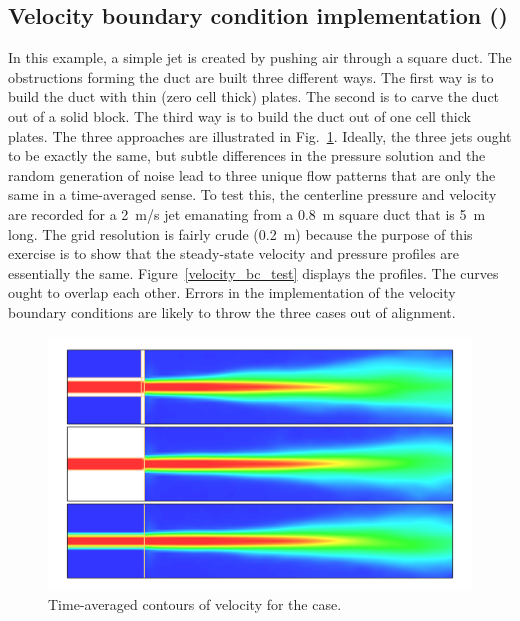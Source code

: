 \documentclass[11pt]{book}
\begin{document}
\subsection{Velocity boundary condition implementation (\texorpdfstring{}{velocity\_bc\_test})}

In this example, a simple jet is created by pushing air through a square duct. The obstructions forming the duct are built three different ways. The first way is to build the duct with thin (zero cell thick) plates. The second is to carve the duct out of a solid block. The third way is to build the duct out of one cell thick plates. The three approaches are illustrated in Fig.~\ref{velocity_bc_test_image}. Ideally, the three jets ought to be exactly the same, but subtle differences in the pressure solution and the random generation of noise lead to three unique flow patterns that are only the same in a time-averaged sense. To test this, the centerline pressure and velocity are recorded for a 2~m/s jet emanating from a 0.8~m square duct that is 5~m long. The grid resolution is fairly crude (0.2~m) because the purpose of this exercise is to show that the steady-state velocity and pressure profiles are essentially the same. Figure~\ref{velocity_bc_test} displays the profiles. The curves ought to overlap each other. Errors in the implementation of the velocity boundary conditions are likely to throw the three cases out of alignment.
\begin{figure}[h!]
\begin{center}
\includegraphics[width=\textwidth]{SCRIPT_FIGURES/velocity_bc_test}
\end{center}
\caption[Images of the  test case]{Time-averaged contours of velocity for the  case.}
\label{velocity_bc_test_image}
\end{figure}
\end{document}
